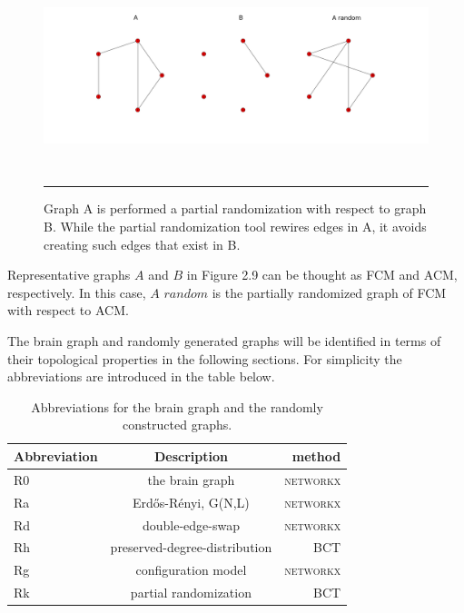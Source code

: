 \begin{figure}[htbp]
  \centering
	\includegraphics[width=\textwidth, height=55mm]{Figures/p1.png}  
    \rule{35em}{0.5pt}
    \caption[Partial Randomization Example]{Graph A is performed a partial randomization with respect to graph B. While the partial randomization tool rewires edges in A, it avoids creating such edges that exist in B.}
  \label{fig:Partial Randomization Example}
\end{figure}

Representative graphs $A$ and $B$ in Figure 2.9 can be thought as FCM and ACM, respectively. In this case, $A \,\, random$ is the partially randomized graph of FCM with respect to ACM.


The brain graph and randomly generated graphs will be identified in terms of their topological properties in the following sections. For simplicity the abbreviations are introduced in the table below. 

\begin{table}[h]
\begin{center}
\caption[Abbreviations]{Abbreviations for the brain graph and the randomly constructed graphs. }
\begin{tabular}{ l | c | r }
  Abbreviation & Description & method \\
  \hline  \hline                     
  R0 & the brain graph						  & \textsc{networkx} \\ \hline
  Ra & Erd\H{o}s-R\'{e}nyi, G(N,L)            & \textsc{networkx} \\ \hline
  Rd & double-edge-swap            			  & \textsc{networkx} \\ \hline
  Rh & preserved-degree-distribution		  & \textsc{BCT} 	 \\ \hline  
  Rg & configuration model       			  & \textsc{networkx} \\ \hline
  Rk & partial randomization            	  & \textsc{BCT} 	 \\ \hline  
  \hline  
\end{tabular}
\label{table:Abbreviations}
\end{center}
\end{table}	

